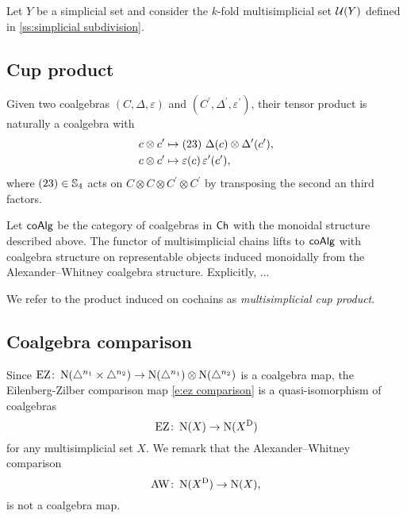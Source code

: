 Let $Y$ be a simplicial set and consider the $k$-fold multisimplicial set $\cU(Y)$ defined in \cref{ss:simplicial subdivision}.

\subsection{Cup product}

Given two coalgebras $(C, \Delta, \varepsilon)$ and $(C^\prime, \Delta^\prime, \varepsilon^\prime)$, their tensor product is naturally a coalgebra with
\[
\begin{split}
c \ot c^\prime &\mapsto (23) \ \Delta(c) \otimes \Delta^\prime(c^\prime), \\
c \ot c^\prime &\mapsto \varepsilon(c) \, \varepsilon^\prime(c^\prime),
\end{split}
\]
where $(23) \in \S_4$ acts on $C \otimes C \otimes C^\prime \otimes C^\prime$ by transposing the second an third factors.

Let $\coAlg$ be the category of coalgebras in $\Ch$ with the monoidal structure described above.
The functor of multisimplicial chains lifts to $\coAlg$ with coalgebra structure on representable objects induced monoidally from the Alexander--Whitney coalgebra structure.
Explicitly, ...

We refer to the product induced on cochains as \textit{multisimplicial cup product}.

\subsection{Coalgebra comparison}

Since $\EZ \colon \chains(\simplex^{n_1} \times \simplex^{n_2}) \to \chains(\simplex^{n_1}) \ot \chains(\simplex^{n_2})$ is a coalgebra map, the Eilenberg-Zilber comparison map \eqref{e:ez comparison} is a quasi-isomorphism of coalgebras
\[
\EZ \colon \chains(X) \to \chains(X^{\diag})
\]
for any multisimplicial set $X$.
We remark that the Alexander--Whitney comparison
\[
\AW \colon \chains(X^{\diag}) \to \chains(X),
\]
is not a coalgebra map.